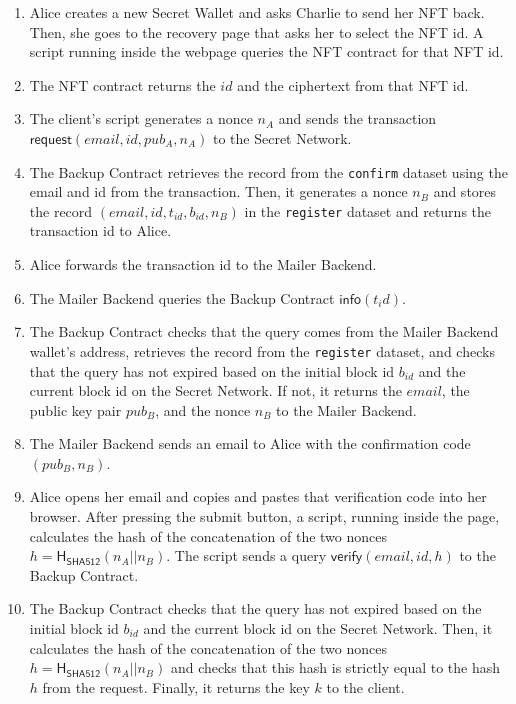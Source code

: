 \documentclass[runningheads]{llncs}
\newcommand{\ms}[1]{\ensuremath{\mathsf{#1}}}
\begin{document}
\begin{enumerate}
\item Alice creates a new Secret Wallet and asks Charlie to send her NFT back. Then, she goes to the recovery page that asks her to select the NFT id. A script running inside the webpage queries the NFT contract for that NFT id.  
\item The NFT contract returns the $id$ and the ciphertext from that NFT id.
\item The client's script generates a nonce $n_A$ and sends the transaction $\ms{request}(email, id, pub_A, n_A)$ to the Secret Network. 
\item The Backup Contract retrieves the record from the {\tt confirm} dataset using the email and id from the transaction. Then, it generates a nonce $n_B$ and stores the record $(email, id, t_{id}, b_{id}, n_B)$ in the {\tt register} dataset and returns the transaction id to Alice.
\item Alice forwards the transaction id to the Mailer Backend. 
\item The Mailer Backend queries the Backup Contract $\ms{info}(t_id)$. 
\item The Backup Contract checks that the query comes from the Mailer Backend wallet's address, retrieves the record from the {\tt register} dataset, and checks that the query has not expired based on the initial block id $b_{id}$ and the current block id on the Secret Network. If not, it returns the $email$, the public key pair $pub_B$, and the nonce $n_B$ to the Mailer Backend. 
\item The Mailer Backend sends an email to Alice with the confirmation code $(pub_B, n_B)$. 
\item Alice opens her email and copies and pastes that verification code into her browser. After pressing the submit button, a script, running inside the page, calculates the hash of the concatenation of the two nonces $h=\ms{H_{\ms{SHA512}}}(n_A || n_B)$. The script sends a query $\ms{verify}({email, id, h})$ to the Backup Contract. 
\item The Backup Contract checks that the query has not expired based on the initial block id $b_{id}$ and the current block id on the Secret Network. Then, it calculates the hash of the concatenation of the two nonces $h=\ms{H_{\ms{SHA512}}}(n_A || n_B)$ and checks that this hash is strictly equal to the hash $h$ from the request. Finally, it returns the key $k$ to the client. 
\end{enumerate}
\end{document}
